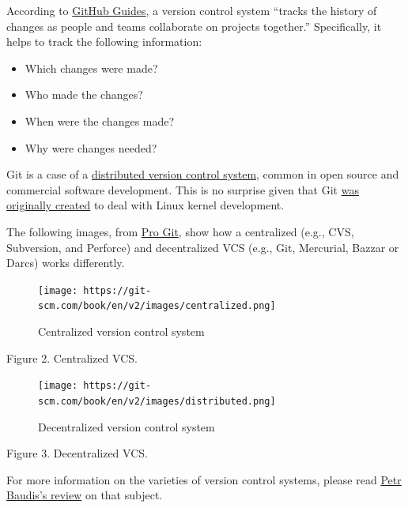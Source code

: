 \documentclass[
  letterpaper,
  DIV=11,
  numbers=noendperiod]{scrreprt}
\providecommand{\tightlist}{%
  \setlength{\itemsep}{0pt}\setlength{\parskip}{0pt}}\usepackage{longtable,booktabs,array}
\begin{document}
According to \href{https://guides.GitHub.com}{GitHub Guides}, a version
control system ``tracks the history of changes as people and teams
collaborate on projects together.'' Specifically, it helps to track the
following information:

\begin{itemize}
\tightlist
\item
  Which changes were made?
\item
  Who made the changes?
\item
  When were the changes made?
\item
  Why were changes needed?
\end{itemize}

Git is a case of a
\href{https://en.wikipedia.org/wiki/Distributed_version_control}{distributed
version control system}, common in open source and commercial software
development. This is no surprise given that Git
\href{https://lkml.org/lkml/2005/4/6/121}{was originally created} to
deal with Linux kernel development.

The following images, from \href{git-scm.com}{Pro Git}, show how a
centralized (e.g., CVS, Subversion, and Perforce) and decentralized VCS
(e.g., Git, Mercurial, Bazzar or Darcs) works differently.

\begin{figure}

{\centering \texttt{[image: https://git-scm.com/book/en/v2/images/centralized.png]}

}

\caption{Centralized version control system}

\end{figure}

Figure 2. Centralized VCS.

\begin{figure}

{\centering \texttt{[image: https://git-scm.com/book/en/v2/images/distributed.png]}

}

\caption{Decentralized version control system}

\end{figure}

Figure 3. Decentralized VCS.

For more information on the varieties of version control systems, please
read
\href{https://pdfs.semanticscholar.org/4490/4c70bc91e1bed4fe02b9e2282f031b7c90ea.pdf}{Petr
Baudis's review} on that subject.
\end{document}
